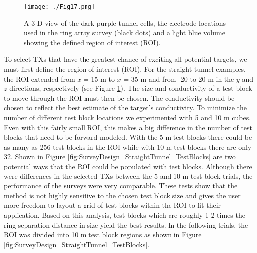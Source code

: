 \documentclass[preprint,authoryear,12pt]{elsarticle}
\begin{document}
\begin{figure}[htp]
   \begin{center}
      \texttt{[image: ./Fig17.png]}
   \end{center}
\caption{A 3-D view of the dark purple tunnel cells, the electrode locations used in the ring array survey (black dots) and a light blue volume showing the defined region of interest (ROI).}
\label{fig:SurveyDesign_StraightTunnel_ROI}
\end{figure}


To select TXs that have the greatest chance of exciting all potential targets, we must first define the region of interest (ROI). For the straight tunnel examples, the ROI extended from $x$ = 15 m to $x$ = 35 m and from -20 to 20 m in the $y$ and $z$-directions, respectively (see Figure \ref{fig:SurveyDesign_StraightTunnel_ROI}). The size and conductivity of a test block to move through the ROI must then be chosen. The conductivity should be chosen to reflect the best estimate of the target's conductivity. To minimize the number of different test block locations we experimented with 5 and 10 m cubes. Even with this fairly small ROI, this makes a big difference in the number of test blocks that need to be forward modeled. With the 5 m test blocks there could be as many as 256 test blocks in the ROI while with 10 m test blocks there are only 32. Shown in Figure \ref{fig:SurveyDesign_StraightTunnel_TestBlocks} are two potential ways that the ROI could be populated with test blocks. Although there were differences in the selected TXs between the 5 and 10 m test block trials, the performance of the surveys were very comparable. These tests show that the method is not highly sensitive to the chosen test block size and gives the user more freedom to layout a grid of test blocks within the ROI to fit their application. Based on this analysis, test blocks which are roughly 1-2 times the ring separation distance in size yield the best results. In the following trials, the ROI was divided into 10 m test block regions as shown in Figure \ref{fig:SurveyDesign_StraightTunnel_TestBlocks}.
\end{document}
